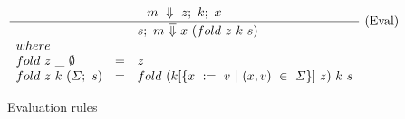 \begin{figure*}
$$
\frac {\displaystyle 
    m ~\Downarrow~ z;~k;~x
} {\displaystyle 
    \begin{array}{lcl}
    & & s;~m ~\overline{\Downarrow}~ x~(\mit{fold}~z~k~s)
    \\
    \mit{where} \\
    \mit{fold}~z~\_~\emptyset & = & z \\
    \mit{fold}~z~k~(\Sigma;~s) & = & \mit{fold}~(k[\{x~:=~v~|~(x,v)~\in~\Sigma\}]~z)~k~s \\
    \end{array}
} \ 
\textrm{(Eval)}
$$





\caption{Evaluation rules}
\label{fig:source:eval}
\end{figure*}


